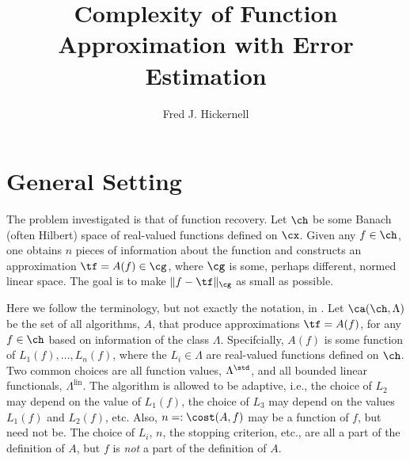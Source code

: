 \documentclass[12pt]{amsart}
\DeclareMathOperator{\lin}{lin}
\begin{document}
\title{Complexity of Function Approximation with Error Estimation}
\author{Fred J. Hickernell}
\address{Room E1-208, Department of Applied Mathematics, Illinois Institute of Technology, 10 W.\ 32$^{\text{nd}}$ St., Chicago, IL 60616}
\begin{abstract}
\end{abstract}
\maketitle

\section{General Setting}
The problem investigated is that of function recovery.  Let $\ch$ be some Banach (often Hilbert) space of real-valued functions defined on $\cx$.  Given any $f \in \ch$, one obtains $n$ pieces of information about the function and constructs an approximation $\tf=A(f) \in \cg$, where $\cg$ is some, perhaps different, normed linear space.   The goal is to make $\lVert f - \tf \rVert_{\cg}$ as small as possible.  

Here we follow the terminology, but not exactly the notation, in \cite[Section 3.2]{TraWasWoz88}. Let $\ca(\ch,\Lambda)$ be the set of all algorithms, $A$, that produce approximations $\tf=A(f)$, for any $f \in \ch$ based on information of the class $\Lambda$.  Specifcially, $A(f)$ is some function of $L_1(f), \ldots, L_n(f)$, where the $L_i \in \Lambda$ are real-valued functions defined on $\ch$.  Two common choices are all function values, $\Lambda^{\std}$, and all bounded linear functionals, $\Lambda^{\lin}$.  The algorithm is allowed to be adaptive, i.e., the choice of $L_2$ may depend on the value of $L_1(f)$, the choice of $L_3$ may depend on the values $L_1(f)$ and $L_2(f)$, etc.  Also, $n=:\cost(A,f)$ may be a function of $f$, but need not be.  The choice of $L_i$, $n$, the stopping criterion, etc., are all a part of the definition of $A$, but $f$ is \emph{not} a part of the definition of $A$.
\end{document}
